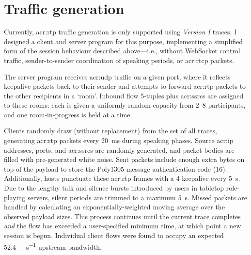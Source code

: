 \section{Traffic generation}
Currently, \gls{acr:rtp} traffic generation is only supported using \emph{Version \RN{1}} traces.
I designed a client and server program for this purpose, implementing a simplified form of the session behaviour described above---i.e., without WebSocket control traffic, sender-to-sender coordination of speaking periods, or \gls{acr:rtcp} packets.

The server program receives \gls{acr:udp} traffic on a given port, where it reflects keepalive packets back to their sender and attempts to forward \gls{acr:rtp} packets to the other recipients in a `room'.
Inbound flow 5-tuples plus \glspl{acr:ssrc} are assigned to these rooms: each is given a uniformly random capacity from \numrange{2}{8} participants, and one room-in-progress is held at a time.

Clients randomly draw (without replacement) from the set of all traces, generating \gls{acr:rtp} packets every \qty{20}{\milli\second} during speaking phases.
Source \gls{acr:ip} addresses, ports, and \glspl{acr:ssrc} are randomly generated, and packet bodies are filled with pre-generated white noise.
Sent packets include enough extra bytes on top of the payload to store the Poly1305 message authentication code (\qty{16}{\byte}).
Additionally, hosts punctuate these \gls{acr:rtp} frames with a \qty{4}{\byte} keepalive every \qty{5}{\second}.
Due to the lengthy talk and silence bursts introduced by users in tabletop role-playing servers, silent periods are trimmed to a maximum \qty{5}{\second}.
Missed packets are handled by calculating an exponentially-weighted moving average over the observed payload sizes.
This process continues until the current trace completes \emph{and} the flow has exceeded a user-specified minimum time, at which point a new session is begun.
Individual client flows were found to occupy an expected \qty{52.4}{\kilo\bit\per\second} upstream bandwidth.

%


